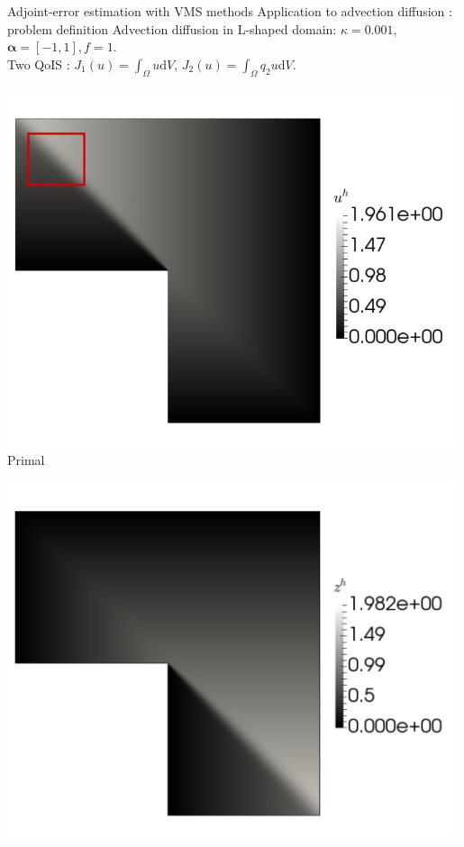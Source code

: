 \documentclass[fleqn]{beamer}
\newcommand{\bs}[1]{\boldsymbol{#1}}
\begin{document}
\begin{frame}{Adjoint-error estimation with VMS methods}
{Application to advection diffusion : problem definition}
Advection diffusion in L-shaped domain: $\kappa = 0.001$, $\bs{\alpha} = [-1,1], f= 1$. \\ [8pt]
Two QoIS : $J_1(u) = \int_{\Omega} u \text{d} V$,   $J_2(u) = \int_{\Omega} q_2 u \text{d} V$. \\ [8pt]
\begin{minipage}{0.33\textwidth}
\centering
\includegraphics[width=0.99\textwidth]{../img/defend_lshape_uh} \\
Primal
\end{minipage}%
\begin{minipage}{0.33\textwidth}
\centering
\includegraphics[width=0.99\textwidth]{../img/vms_lshape_global_zh} \\

\end{minipage}
\end{frame}
\end{document}
